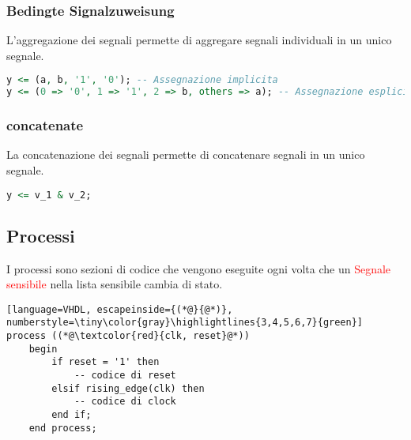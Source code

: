         \subsubsection{Bedingte Signalzuweisung}
            L'aggregazione dei segnali permette di aggregare segnali individuali in un unico segnale.
            \begin{lstlisting}[language=VHDL]
y <= (a, b, '1', '0'); -- Assegnazione implicita
y <= (0 => '0', 1 => '1', 2 => b, others => a); -- Assegnazione esplicita (<posizione_vettoriale> => <valore>)
            \end{lstlisting}
    
        \subsubsection{concatenate}
            La concatenazione dei segnali permette di concatenare segnali in un unico segnale.
            \begin{lstlisting}[language=VHDL]
y <= v_1 & v_2;
            \end{lstlisting}


    \subsection{Processi}
        I processi sono sezioni di codice che vengono eseguite ogni volta che un \textcolor{red}{Segnale sensibile} nella lista sensibile cambia di stato.
        \begin{lstlisting}[language=VHDL, escapeinside={(*@}{@*)}, numberstyle=\tiny\color{gray}\highlightlines{3,4,5,6,7}{green}]
process ((*@\textcolor{red}{clk, reset}@*))
    begin
        if reset = '1' then
            -- codice di reset
        elsif rising_edge(clk) then
            -- codice di clock
        end if;
    end process;
        \end{lstlisting}